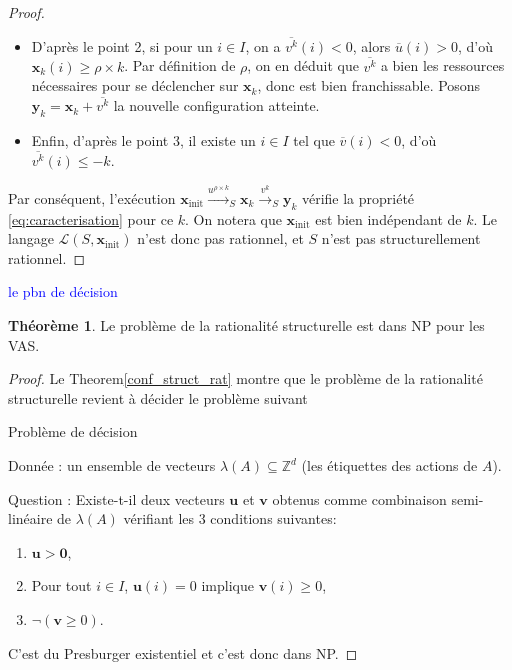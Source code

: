 \documentclass[a4paper,final]{article}
\theoremstyle{definition}
\newtheorem{Theorem}{Théorème}
\let\leq\leqslant
\let\geq\geqslant
\newcommand{\alain}[1]{\textcolor{blue}{#1}}
\newcommand{\Z}{\ensuremath{\mathbb{Z}}}
\newcommand{\lang}{\ensuremath{\mathcal{L}}}
\newcommand{\trans}[2]{\ensuremath{\stackrel{#1}{\longrightarrow}_{#2}}}
\newcommand{\vect}[1]{\ensuremath{\mathbf{#1}}}
\newcommand{\xinit}{\ensuremath{\vect{x}_\text{init}}}
\newcommand{\valeur}[1]{\ensuremath{\overline{#1}}}
\begin{document}
\begin{proof}
\begin{itemize}
    \item D'après le point 2, si pour un $i\in I$, on a $\valeur{v^k}(i) < 0$, alors $\valeur{u}(i) > 0$, d'où $\vect{x}_k(i) \geq \rho\times k$.
    Par définition de $\rho$, on en déduit que $\valeur{v^k}$ a bien les ressources nécessaires pour se déclencher sur $\vect{x}_k$, donc est bien franchissable.
    Posons $\vect{y}_k = \vect{x}_k + \valeur{v^k}$ la nouvelle configuration atteinte.
    
    \item Enfin, d'après le point 3, il existe un $i\in I$ tel que $\valeur{v}(i) < 0$, d'où $\valeur{v^k}(i) \leq -k$.
\end{itemize}
Par conséquent, l'exécution $\xinit \trans{u^{\rho\times k}}{S} \vect{x}_k \trans{v^k}{S} \vect{y}_k$ vérifie la propriété \eqref{eq:caracterisation} pour ce $k$.
On notera que $\xinit$ est bien indépendant de $k$.
Le langage $\lang(S,\xinit)$ n'est donc pas rationnel, et $S$ n'est pas structurellement rationnel.
\end{proof}

\alain{le pbn de décision}

\begin{Theorem}\label{NP conf_struct_rat}
Le  problème de la rationalité structurelle est dans NP pour les VAS.
\end{Theorem}

\begin{proof}
Le Theorem\ref{conf_struct_rat} montre que le problème de la rationalité structurelle revient à décider le problème suivant

Problème de décision

Donnée : un ensemble de vecteurs $\lambda(A) \subseteq \Z^d$ (les étiquettes des actions de $A$).

Question : Existe-t-il deux vecteurs $\vect{u}$ et $\vect{v}$ obtenus comme combinaison semi-linéaire de $\lambda(A)$ vérifiant les 3 conditions suivantes:
\begin{enumerate}
    \item $\vect{u} > \vect{0}$,
    \item Pour tout $i \in I$, $\vect{u}(i)=0$ implique $\vect{v}(i) \geq 0$,
    \item  $\lnot(\vect{v} \geq 0)$.
\end{enumerate}
C'est du Presburger existentiel et c'est donc dans NP.
\end{proof}

\end{document}
